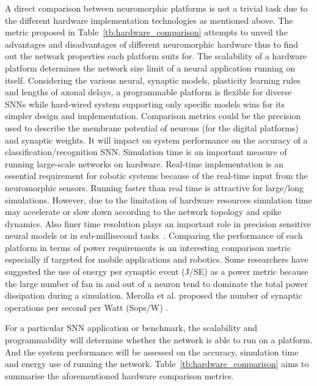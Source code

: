 A direct comparison between neuromorphic platforms is not a trivial task due to the different hardware implementation technologies as mentioned above.
The metric proposed in Table~\ref{tb:hardware_comparison} attempts to unveil the advantages and disadvantages of different neuromorphic hardware thus to find out the network properties each platform suits for.
The scalability of a hardware platform determines the network size limit of a neural application running on itself.
Considering the various neural, synaptic models, plasticity learning rules and lengths of axonal delays, a programmable platform is flexible for diverse SNNs while hard-wired system supporting only specific models wins for its simpler design and implementation.
Comparison metrics could be the precision used to describe the membrane potential of neurons (for the digital platforms) and synaptic weights.
It will impact on system performance on the accuracy of a classification/recognition SNN.
Simulation time is an important measure of running large-scale networks on hardware.
Real-time implementation is an essential requirement for robotic systems because of the real-time input from the neuromorphic sensors.
Running faster than real time is attractive for large/long simulations.
However, due to the limitation of hardware resources simulation time may accelerate or slow down according to the network topology and spike dynamics.
Also finer time resolution plays an important role in precision sensitive neural models or in sub-millisecond tasks~\citep{lagorce2015breaking}.
Comparing the performance of each platform in terms of power requirements is an interesting comparison metric especially if targeted for mobile applications and robotics. Some researchers have suggested the use of energy per synaptic event (J/SE) \citep{Sharp2012110,strometal} as a power metric because the large number of fan in and out of a neuron tend to dominate the total power dissipation during a simulation. Merolla et al. proposed the number of synaptic operations per second per Watt (Sops/W) \citep{Merolla08082014}. 

For a particular SNN application or benchmark, the scalability and programmability will determine whether the network is able to run on a platform.
And the system performance will be assessed on the accuracy, simulation time and energy use of running the network. 
Table~\ref{tb:hardware_comparison} aims to summarise the aforementioned hardware comparison metrics.
 

